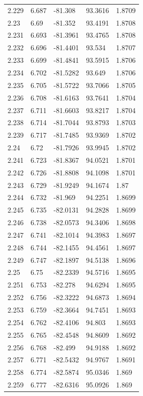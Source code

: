 \begin{tabular}{lllll}
2.229 & 6.687 & -81.308 & 93.3616 & 1.8709 \\
2.23 & 6.69 & -81.352 & 93.4191 & 1.8708 \\
2.231 & 6.693 & -81.3961 & 93.4765 & 1.8708 \\
2.232 & 6.696 & -81.4401 & 93.534 & 1.8707 \\
2.233 & 6.699 & -81.4841 & 93.5915 & 1.8706 \\
2.234 & 6.702 & -81.5282 & 93.649 & 1.8706 \\
2.235 & 6.705 & -81.5722 & 93.7066 & 1.8705 \\
2.236 & 6.708 & -81.6163 & 93.7641 & 1.8704 \\
2.237 & 6.711 & -81.6603 & 93.8217 & 1.8704 \\
2.238 & 6.714 & -81.7044 & 93.8793 & 1.8703 \\
2.239 & 6.717 & -81.7485 & 93.9369 & 1.8702 \\
2.24 & 6.72 & -81.7926 & 93.9945 & 1.8702 \\
2.241 & 6.723 & -81.8367 & 94.0521 & 1.8701 \\
2.242 & 6.726 & -81.8808 & 94.1098 & 1.8701 \\
2.243 & 6.729 & -81.9249 & 94.1674 & 1.87 \\
2.244 & 6.732 & -81.969 & 94.2251 & 1.8699 \\
2.245 & 6.735 & -82.0131 & 94.2828 & 1.8699 \\
2.246 & 6.738 & -82.0573 & 94.3406 & 1.8698 \\
2.247 & 6.741 & -82.1014 & 94.3983 & 1.8697 \\
2.248 & 6.744 & -82.1455 & 94.4561 & 1.8697 \\
2.249 & 6.747 & -82.1897 & 94.5138 & 1.8696 \\
2.25 & 6.75 & -82.2339 & 94.5716 & 1.8695 \\
2.251 & 6.753 & -82.278 & 94.6294 & 1.8695 \\
2.252 & 6.756 & -82.3222 & 94.6873 & 1.8694 \\
2.253 & 6.759 & -82.3664 & 94.7451 & 1.8693 \\
2.254 & 6.762 & -82.4106 & 94.803 & 1.8693 \\
2.255 & 6.765 & -82.4548 & 94.8609 & 1.8692 \\
2.256 & 6.768 & -82.499 & 94.9188 & 1.8692 \\
2.257 & 6.771 & -82.5432 & 94.9767 & 1.8691 \\
2.258 & 6.774 & -82.5874 & 95.0346 & 1.869 \\
2.259 & 6.777 & -82.6316 & 95.0926 & 1.869 \\

\end{tabular}
